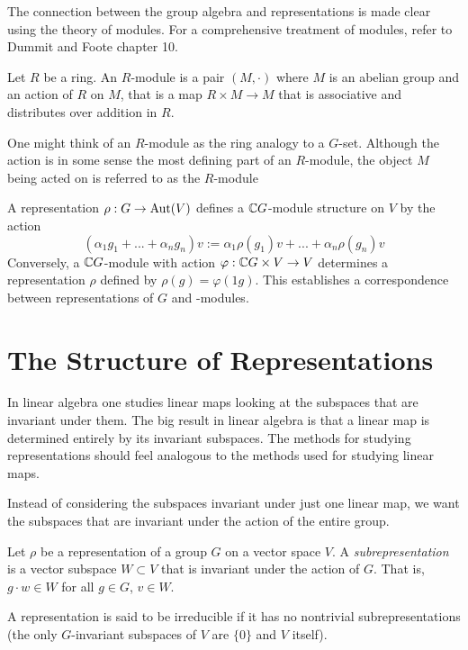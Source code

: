 The connection between the group algebra and representations is made clear using the theory of modules. For a 
comprehensive treatment of modules, refer to Dummit and Foote \cite{foote} chapter 10.

\begin{definition}
    Let $R$ be a ring. An $R$-module is a pair $(M, \cdot)$ where $M$ is an abelian group and an action of $R$ 
    on $M$, that is a map $R \times M \rightarrow M$ that is associative and distributes over addition in $R$.

    One might think of an $R$-module as the ring analogy to a $G$-set. Although the action is in some sense the 
    most defining part of an $R$-module, the object $M$ being acted on is referred to as the $R$-module
 \end{definition}

A representation $\rho : G \rightarrow \operatorname{Aut}(V)$ defines a $\mathbb{C} G$-module structure on $V$ by the action
\[
    (\alpha_1g_1 + ... + \alpha_ng_n) v := \alpha_1\rho(g_1)v + ...+ \alpha_n\rho(g_n)v
\]
Conversely, a $\mathbb{C} G$-module with action $\varphi : \mathbb{C} G \times V \rightarrow V$ determines a representation $\rho$ 
defined by $\rho(g) = \varphi(1g)$. This establishes a correspondence between representations of $G$ and 
\CG-modules.


\section{The Structure of Representations}

In linear algebra one studies linear maps looking at the subspaces that are invariant under them. The big result in 
linear algebra is that a linear map is determined entirely by its invariant subspaces. The methods for studying 
representations should feel analogous to the methods used for studying linear maps. 

Instead of considering the subspaces invariant under just one linear map, we want the subspaces that are invariant 
under the action of the entire group. 

\begin{definition}
    Let $\rho$ be a representation of a group $G$ on a vector space $V$. A \emph{subrepresentation} is a vector 
    subspace $W \subset V$ that is invariant under the action of $G$. That is, $g\cdot w \in W$ for all $g \in G$, 
    $v \in W$.
 

    A representation is said to be irreducible if it has no nontrivial subrepresentations (the only $G$-invariant 
    subspaces of $V$ are $\{ 0 \}$ and $V$ itself).
\end{definition}

